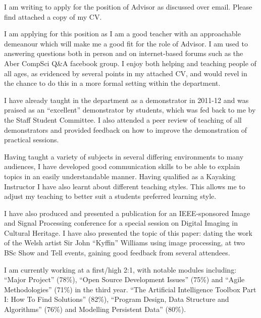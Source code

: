 \documentclass[10pt,stdletter,dateno,sigleft]{newlfm} %
\begin{document}
\begin{newlfm}


I am writing to apply for the position of Advisor as discussed over email. Please find attached a copy of my CV.



I am applying for this position as I am a good teacher with an approachable demeanour which will make me a good fit for the role of Advisor. I am used to answering questions both in person and on internet-based forums such as the Aber CompSci Q\&A facebook group. I enjoy both helping and teaching people of all ages, as evidenced by several points in my attached CV, and would revel in the chance to do this in a more formal setting within the department.

I have already taught in the department as a demonstrator in 2011-12 and was praised as an ``excellent'' demonstrator by students, which was fed back to me by the Staff Student Committee. I also attended a peer review of teaching of all demonstrators and provided feedback on how to improve the demonstration of practical sessions.

Having taught a variety of subjects in several differing environments to many audiences, I have developed good communication skills to be able to explain topics in an easily understandable manner. Having qualified as a Kayaking Instructor I have also learnt about different teaching styles. This allows me to adjust my teaching to better suit a students preferred learning style.

I have also produced and presented a publication for an IEEE-sponsored Image and Signal Processing conference for a special session on Digital Imaging in Cultural Heritage. I have also presented the topic of this paper: dating the work of the Welsh artist Sir John ``Kyffin'' Williams using image processing, at two BSc Show and Tell events, gaining good feedback from several attendees.

I am currently working at a first/high 2:1, with notable modules including: ``Major Project'' (78\%), ``Open Source Development Issues'' (75\%) and ``Agile Methodologies'' (71\%) in the third year. ``The Artificial Intelligence Toolbox Part I: How To Find Solutions'' (82\%), ``Program Design, Data Structure and Algorithms'' (76\%) and Modelling Persistent Data'' (80\%).


\end{newlfm}
\end{document}

